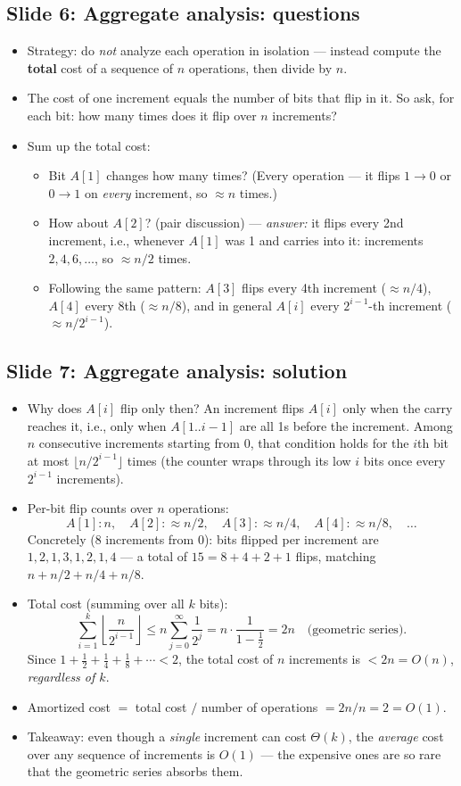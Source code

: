 \documentclass[11pt]{article}
\newcommand{\slide}[2]{\subsection*{Slide #1: #2}}
\begin{document}
\slide{6}{Aggregate analysis: questions}
\begin{itemize}
  \item Strategy: do \emph{not} analyze each operation in isolation --- instead compute the \textbf{total} cost of a sequence of $n$ operations, then divide by $n$.
  \item The cost of one increment equals the number of bits that flip in it. So ask, for each bit: how many times does it flip over $n$ increments?
  \item Sum up the total cost:
  \begin{itemize}
    \item Bit $A[1]$ changes how many times? (Every operation --- it flips $1 \to 0$ or $0 \to 1$ on \emph{every} increment, so $\approx n$ times.)
    \item How about $A[2]$? \hfill (pair discussion) --- \emph{answer:} it flips every 2nd increment, i.e., whenever $A[1]$ was 1 and carries into it: increments $2, 4, 6, \ldots$, so $\approx n/2$ times.
    \item Following the same pattern: $A[3]$ flips every 4th increment ($\approx n/4$), $A[4]$ every 8th ($\approx n/8$), and in general $A[i]$ every $2^{i-1}$-th increment ($\approx n/2^{i-1}$).
  \end{itemize}
\end{itemize}

\slide{7}{Aggregate analysis: solution}
\begin{itemize}
  \item Why does $A[i]$ flip only then? An increment flips $A[i]$ only when the carry reaches it, i.e., only when $A[1..i-1]$ are all 1s before the increment. Among $n$ consecutive increments starting from $0$, that condition holds for the $i$th bit at most $\lfloor n / 2^{i-1} \rfloor$ times (the counter wraps through its low $i$ bits once every $2^{i-1}$ increments).
  \item Per-bit flip counts over $n$ operations:
        \[ A[1]: n, \quad A[2]: \approx n/2, \quad A[3]: \approx n/4, \quad A[4]: \approx n/8, \quad \ldots \]
        Concretely (8 increments from $0$): bits flipped per increment are $1, 2, 1, 3, 1, 2, 1, 4$ --- a total of $15 = 8 + 4 + 2 + 1$ flips, matching $n + n/2 + n/4 + n/8$.
  \item Total cost (summing over all $k$ bits):
        \[ \sum_{i=1}^{k} \left\lfloor \frac{n}{2^{i-1}} \right\rfloor \le n \sum_{j=0}^{\infty} \frac{1}{2^{j}} = n \cdot \frac{1}{1 - \tfrac12} = 2n \quad \text{(geometric series)}. \]
        Since $1 + \tfrac12 + \tfrac14 + \tfrac18 + \cdots < 2$, the total cost of $n$ increments is $< 2n = O(n)$, \emph{regardless of $k$}.
  \item Amortized cost $=$ total cost $/$ number of operations $= 2n/n = 2 = O(1)$.
  \item Takeaway: even though a \emph{single} increment can cost $\Theta(k)$, the \emph{average} cost over any sequence of increments is $O(1)$ --- the expensive ones are so rare that the geometric series absorbs them.
\end{itemize}
\end{document}
